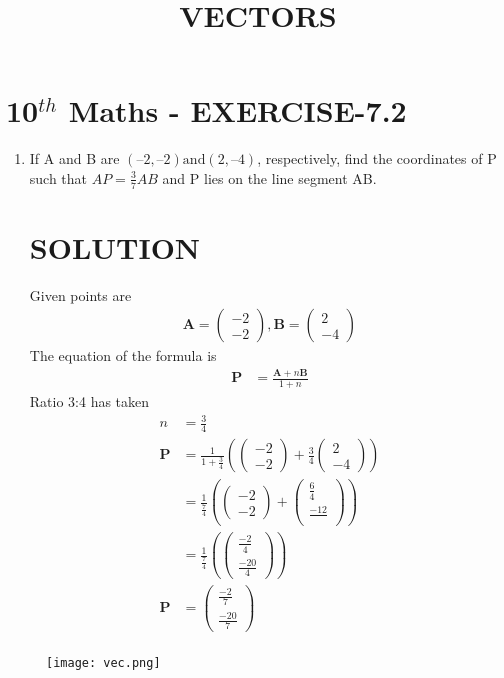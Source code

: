 \documentclass[journal,10pt,twocolumn]{article}
\providecommand{\brak}[1]{\ensuremath{\left(#1\right)}}
\newcommand{\myvec}[1]{\ensuremath{\begin{pmatrix}#1\end{pmatrix}}}
\let\vec\mathbf
\begin{document}
\begin{center}
\title{\textbf{VECTORS}}
\date{\vspace{-5ex}} %
\maketitle
\end{center}

\section{10$^{th}$ Maths - EXERCISE-7.2}

\begin{enumerate}
\item If A and B are $(– 2, – 2) \text{and} (2, – 4)$, respectively, find the coordinates of P such that $AP =\frac{3}{7}AB$ and P lies on the line segment AB. 

\section{SOLUTION}
Given points are
\begin{align}
\vec{A}=\myvec{-2\\ -2} ,
\vec{B}=\myvec{2\\ -4}
\end{align}
The equation of the formula is
\begin{align}
\vec{P}&=\frac{\vec{A}+n\vec{B}}{1+n}
\end{align}
Ratio 3:4 has taken 
\begin{align}
n&=\frac{3}{4}\\
\vec{P}&=\frac{1}{1+\frac{3}{4}}\brak{\myvec{-2\\-2}+\frac{3}{4}\myvec{2\\-4}}\\
&=\frac{1}{\frac{7}{4}}\brak{\myvec{-2\\ -2}+\myvec{\frac{6}{4}\\ \frac{-12}{}}}\\
&=\frac{1}{\frac{7}{4}}\brak {\myvec{\frac{-2}{4}\\ \frac{-20}{4}}}\\
\vec{P}&=\myvec{\frac{-2}{7}\\ \frac{-20}{7}}\\
\end{align}
\end{enumerate}
\begin{figure}
   \centering 
 \texttt{[image: vec.png]}
   \caption{}
   \label{fig:vec.png}
   \end{figure}
\end{document}
